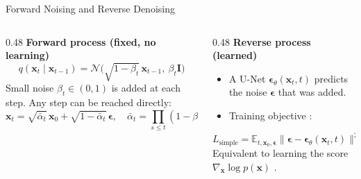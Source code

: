 \documentclass[11pt,aspectratio=169]{beamer}
\newcommand{\Head}[1]{\textcolor{Main}{\textbf{#1}}}
\begin{document}
\begin{frame}{Forward Noising and Reverse Denoising}
  \vspace{0.2cm}
  \begin{columns}[T,onlytextwidth]
    \begin{column}{0.48\textwidth}
      \Head{Forward process (fixed, no learning)}
      \[ q(\mathbf{x}_t\mid\mathbf{x}_{t-1}) = \mathcal{N}\big(\sqrt{1-\beta_t}\,\mathbf{x}_{t-1},\ \beta_t\mathbf{I}\big) \]
      \small Small noise $\beta_t\in(0,1)$ is added at each step. Any step can be reached directly:
      \[ \mathbf{x}_t = \sqrt{\bar\alpha_t}\,\mathbf{x}_0 + \sqrt{1-\bar\alpha_t}\,\bm\epsilon,\quad \bar\alpha_t=\textstyle\prod_{s\le t}(1-\beta_s) \]
    \end{column}
    \begin{column}{0.48\textwidth}
      \Head{Reverse process (learned)}
      \begin{itemize}\small
        \item A U-Net $\bm\epsilon_\theta(\mathbf{x}_t,t)$ predicts the noise $\bm\epsilon$ that was added.
        \item Training objective \cite{ho2020denoising}:
      \end{itemize}
      \[ L_{\text{simple}} = \mathbb{E}_{t,\mathbf{x}_0,\bm\epsilon}\big\|\bm\epsilon-\bm\epsilon_\theta(\mathbf{x}_t,t)\big\|^2 \]
      \small Equivalent to learning the score $\nabla_{\mathbf{x}}\log p(\mathbf{x})$ \cite{song2019generative}.
    \end{column}
  \end{columns}
\end{frame}
\end{document}
